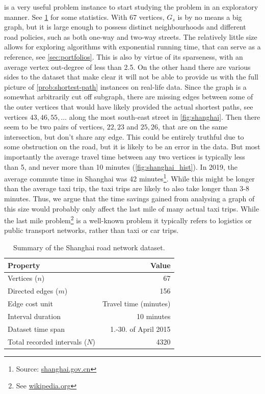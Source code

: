  is a very useful problem instance to start studying the  problem in an exploratory manner. See \cref{tab:shanghai-stats} for some statistics. With 67 vertices, $G_s$ is by no means a big graph, but it is large enough to possess distinct neighbourhoods and different road policies, such as both one-way and two-way streets. The relatively little size allows for exploring algorithms with exponential running time, that can serve as a reference, see \cref{sec:portfolios}. This is also by virtue of its sparseness, with an average vertex out-degree of less than 2.5.
On the other hand there are various sides to the dataset that make clear it will not be able to provide us with the full picture of \cref{prob:shortest-path} instances on real-life data. Since the graph is a somewhat arbitrarily cut off subgraph, there are missing edges between some of the outer vertices that would have likely provided the actual shortest paths, see vertices $43, 46, 55, \dots$ along the most south-east street in \cref{fig:shanghai}. Then there seem to be two pairs of vertices, $22,23$ and $25,26$, that are on the same intersection, but don't share any edge. This could be entirely truthful due to some obstruction on the road, but it is likely to be an error in the data.
But most importantly the average travel time between any two vertices is typically less than 5, and never more than 10 minutes (\cref{fig:shanghai_hist}). In 2019, the average commute time in Shanghai was 42 minutes\footnote{Source: \href{https://service.shanghai.gov.cn/sheninfo/specialdetail.aspx?Id=01de1f87-936d-4999-ba8c-0dffaa397ffb}{shanghai.gov.cn}}. While this might be longer than the average taxi trip, the taxi trips are likely to also take longer than 3-8 minutes. Thus, we argue that the time savings gained from analysing a graph of this size would probably only affect the last mile of many actual taxi trips.  While the last mile problem\footnote{See \href{https://en.wikipedia.org/wiki/Last\_mile\_(transportation)}{wikipedia.org}} is a well-known problem it typically refers to logistics or public transport networks, rather than taxi or car trips.

\renewcommand{\arraystretch}{1.2}
\begin{table}[htbp]
\centering
\begin{tabular}{lr}
\textbf{Property} & \textbf{Value} \\
\hline
Vertices ($n$) & 67 \\
Directed edges ($m$) & 156 \\
Edge cost unit & Travel time (minutes) \\
Interval duration & 10 minutes \\
Dataset time span & 1.-30. of April 2015 \\
Total recorded intervals ($N$) & 4320 \\
\hline
\end{tabular}
\vspace{5pt}
\caption{Summary of the Shanghai road network dataset.}
\label{tab:shanghai-stats}
\end{table}



